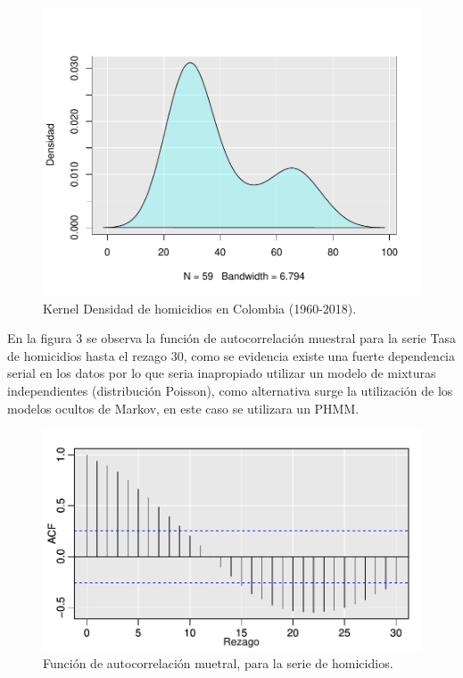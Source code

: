 \documentclass[a4paper]{article}\usepackage[]{graphicx}\usepackage[]{color}
\makeatletter
\def\maxwidth{ %
  \ifdim\Gin@nat@width>\linewidth
    \linewidth
  \else
    \Gin@nat@width
  \fi
}
\newenvironment{knitrout}{}{} %
\makeatother
\begin{document}
\begin{knitrout}
\color{fgcolor}\begin{figure}
\includegraphics[width=\maxwidth]{figure/unnamed-chunk-8-1} \caption[Kernel Densidad de homicidios en Colombia (1960-2018)]{Kernel Densidad de homicidios en Colombia (1960-2018).}\label{fig:unnamed-chunk-8}
\end{figure}


\end{knitrout}

En la figura 3 se observa la función de autocorrelación muestral para la serie Tasa de homicidios hasta el rezago 30, como se evidencia existe una fuerte dependencia serial en los datos por lo que seria inapropiado utilizar un modelo de mixturas independientes (distribución Poisson), como alternativa surge la utilización de los modelos ocultos de Markov, en este caso se utilizara un PHMM.

\begin{knitrout}
\color{fgcolor}\begin{figure}
\includegraphics[width=\maxwidth]{figure/unnamed-chunk-9-1} \caption[Función de autocorrelación muetral, para la serie de homicidios]{Función de autocorrelación muetral, para la serie de homicidios.}\label{fig:unnamed-chunk-9}
\end{figure}


\end{knitrout}
\end{document}
